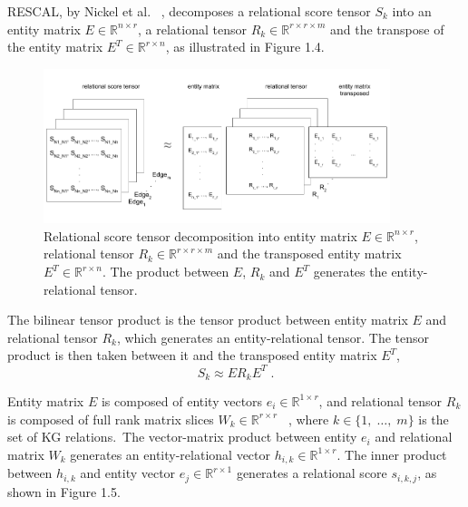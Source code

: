 \noindent RESCAL, by Nickel et al. \unskip~\citep{nickel2011three}, decomposes a relational score tensor $ S_k $ into an entity matrix $ E  \in \mathbb{R}^{n \times r} $, a relational tensor $ R_k \in \mathbb{R}^{r \times r \times m}$ and the transpose of the entity matrix $ E^T \in \mathbb{R}^{r \times n} $, as illustrated in Figure 1.4. \par

\begin{figure}[H]
   	\centering
    	\includegraphics[width=0.9\textwidth, height=0.4\textwidth]{relational_tensor_entity_relational_factorisation}
	\captionsetup{justification=centering}
	\caption{Relational score tensor decomposition into entity matrix $ E  \in \mathbb{R}^{n \times r} $, relational tensor $ R_k \in \mathbb{R}^{r \times r \times m} $ and the transposed entity matrix $ E^T \in \mathbb{R}^{r \times n} $. The product between $ E $, $ R_k $ and $ E^T $ generates the entity-relational tensor.}
\end{figure}

\noindent The bilinear tensor product is the tensor product between entity matrix $ E $ and relational tensor $ R_k $, which generates an entity-relational tensor. The tensor product is then taken between it and the transposed entity matrix $ E^T $, 
\begin{equation}
	S_k \approx ER_kE^T \; .
\end{equation}

\noindent Entity matrix $ E $ is composed of entity vectors $ e_i \in \mathbb{R}^{1 \times r} $, and relational tensor $ R_k $ is composed of full rank matrix slices $ W_k \in \mathbb{R}^{r \times r} $ \unskip~\citep{nickel2012factorizing}, where $ k \in \{1, \; \dots, \; m \} $ is the set of KG relations.\ The vector-matrix product between entity $ e_i $ and relational matrix $ W_k $ generates an entity-relational vector $ h_{i,k} \in \mathbb{R}^{1 \times r} $. The inner product between $ h_{i,k} $ and entity vector $ e_j \in \mathbb{R}^{r \times 1} $ generates a relational score $ s_{i,k,j} $, as shown in Figure 1.5. 

